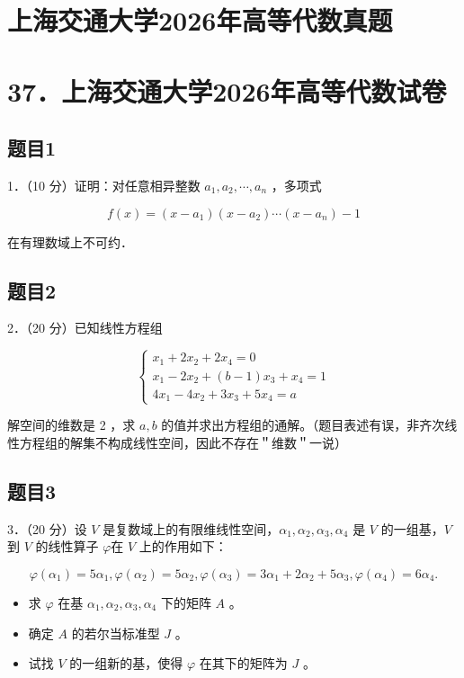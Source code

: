 \documentclass{article}
\begin{document}
\section*{上海交通大学2026年高等代数真题}
\section*{37．上海交通大学2026年高等代数试卷}

\subsection{题目1}
1．（10 分）证明：对任意相异整数 \(a_{1}, a_{2}, \cdots, a_{n}\) ，多项式

\[
f(x)=\left(x-a_{1}\right)\left(x-a_{2}\right) \cdots\left(x-a_{n}\right)-1
\]

在有理数域上不可约．

\subsection{题目2}
2．（20 分）已知线性方程组

\[
\left\{\begin{array}{l}
x_{1}+2 x_{2}+2 x_{4}=0 \\
x_{1}-2 x_{2}+(b-1) x_{3}+x_{4}=1 \\
4 x_{1}-4 x_{2}+3 x_{3}+5 x_{4}=a
\end{array}\right.
\]

解空间的维数是 2 ，求 \(a, b\) 的值并求出方程组的通解。（题目表述有误，非齐次线性方程组的解集不构成线性空间，因此不存在＂维数＂一说）

\subsection{题目3}
3．（20 分）设 \(V\) 是复数域上的有限维线性空间，\(\alpha_{1}, \alpha_{2}, \alpha_{3}, \alpha_{4}\) 是 \(V\) 的一组基，\(V\) 到 \(V\) 的线性算子 \(\varphi\)在 \(V\) 上的作用如下：

\[
\varphi\left(\alpha_{1}\right)=5 \alpha_{1}, \varphi\left(\alpha_{2}\right)=5 \alpha_{2}, \varphi\left(\alpha_{3}\right)=3 \alpha_{1}+2 \alpha_{2}+5 \alpha_{3}, \varphi\left(\alpha_{4}\right)=6 \alpha_{4} .
\]

\begin{itemize}
  \item[（1）] 求 \(\varphi\) 在基 \(\alpha_{1}, \alpha_{2}, \alpha_{3}, \alpha_{4}\) 下的矩阵 \(A\) 。
  \item[（2）] 确定 \(A\) 的若尔当标准型 \(J\) 。
  \item[（3）] 试找 \(V\) 的一组新的基，使得 \(\varphi\) 在其下的矩阵为 \(J\) 。
\end{itemize}
\end{document}
